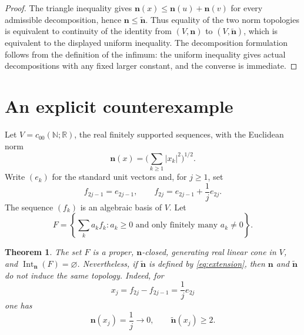 \documentclass[11pt]{article}
\newtheorem{theorem}{Theorem}
\newcommand{\R}{\mathbb R}
\newcommand{\N}{\mathbb N}
\newcommand{\ctz}{c_{00}}
\begin{document}
\begin{proof}
The triangle inequality gives
$\mathbf n(x)\le\mathbf n(u)+\mathbf n(v)$ for every admissible
decomposition, hence $\mathbf n\le\widetilde{\mathbf n}$.  Thus equality of
the two norm topologies is equivalent to continuity of the identity from
$(V,\mathbf n)$ to $(V,\widetilde{\mathbf n})$, which is equivalent to the
displayed uniform inequality.  The decomposition formulation follows from
the definition of the infimum: the uniform inequality gives actual
decompositions with any fixed larger constant, and the converse is
immediate.
\end{proof}

\section{An explicit counterexample}

Let $V=\ctz(\N;\R)$, the real finitely supported sequences, with the
Euclidean norm
\[
 \mathbf n(x)=\Big(\sum_{k\ge1}|x_k|^2\Big)^{1/2}.
\]
Write $(e_k)$ for the standard unit vectors and, for $j\ge1$, set
\[
 f_{2j-1}=e_{2j-1},\qquad
 f_{2j}=e_{2j-1}+\frac1j e_{2j}.
\]
The sequence $(f_k)$ is an algebraic basis of $V$.  Let
\[
 F=\left\{\sum_k a_k f_k:
        a_k\ge0\text{ and only finitely many }a_k\ne0\right\}.
\]

\begin{theorem}\label{thm:counterexample}
The set $F$ is a proper, $\mathbf n$-closed, generating real linear cone in
$V$, and $\operatorname{Int}_{\mathbf n}(F)=\varnothing$.  Nevertheless, if
$\widetilde{\mathbf n}$ is defined by \eqref{eq:extension}, then
$\mathbf n$ and $\widetilde{\mathbf n}$ do not induce the same topology.
Indeed, for
\[
 x_j=f_{2j}-f_{2j-1}=\frac1j e_{2j}
\]
one has
\[
 \mathbf n(x_j)=\frac1j\longrightarrow0,
 \qquad
 \widetilde{\mathbf n}(x_j)\ge2.
\]
\end{theorem}
\end{document}
